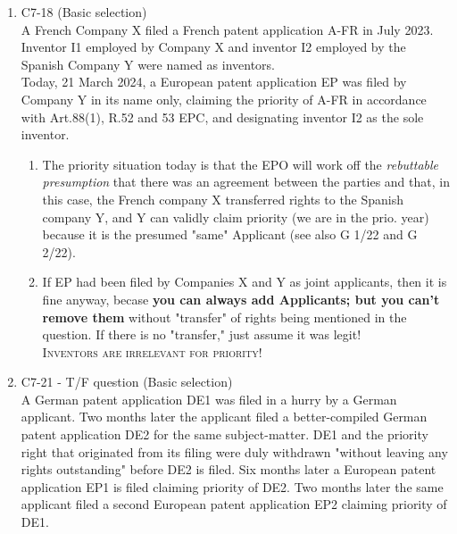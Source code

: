\documentclass{report}
\begin{document}
\begin{enumerate}[label=\textbf{Answer \arabic*}]
\begin{enumerate}[label=\textbf{Answer \arabic*}]
    \item %
    C7-18 (Basic selection) \\
    A French Company X filed a French patent application A-FR in July 2023. Inventor I1 employed by Company X and inventor I2 employed by the Spanish Company Y were named as inventors. \\
    Today, 21 March 2024, a European patent application EP was filed by Company Y in its name only, claiming the priority of A-FR in accordance with Art.88(1), R.52 and 53 EPC, and designating inventor I2 as the sole inventor.
    \begin{enumerate}[label=(\alph*)]
        \item The priority situation today is that the EPO will work off the \textit{rebuttable presumption} that there was an agreement between the parties and that, in this case, the French company X transferred rights to the Spanish company Y, and Y can validly claim priority (we are in the prio. year) because it is the presumed "same" Applicant (see also \textsc{G 1/22} and \textsc{G 2/22}). 
        \item If EP had been filed by Companies X and Y as joint applicants, then it is fine anyway, becase \textbf{you can always add Applicants; but you can't remove them} without "transfer" of rights being mentioned in the question. If there is no "transfer," just assume it was legit! \\
\textsc{Inventors are irrelevant for priority!}
    \end{enumerate}

    \item %
    C7-21 - T/F question (Basic selection) \\
    A German patent application DE1 was filed in a hurry by a German applicant. Two months later the applicant filed a better-compiled German patent application DE2 for the same subject-matter. DE1 and the priority right that originated from its filing were duly withdrawn "without leaving any rights outstanding" before DE2 is filed. Six months later a European patent application EP1 is filed claiming priority of DE2. Two months later the same applicant filed a second European patent application EP2 claiming priority of DE1.
    

\end{enumerate}
\end{enumerate}
\end{document}
